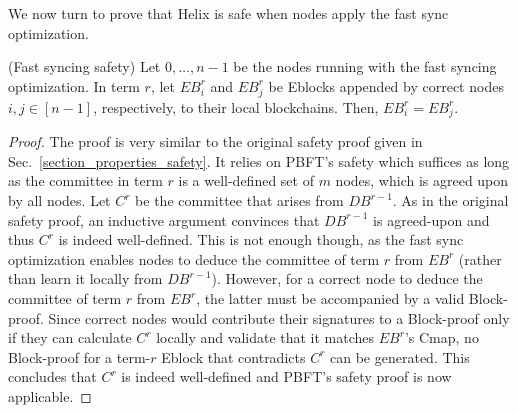 We now turn to prove that Helix is safe when nodes apply the fast sync optimization.
\begin{claim}{(Fast syncing safety)}
Let $0,\dots,n-1$ be the nodes running \name with the fast syncing optimization. In term $r$, let $EB^r_i$ and $EB^r_j$ be Eblocks appended by correct nodes $i,j\in [n-1]$, respectively, to their local blockchains. Then, $EB^r_i=EB^r_j$.
\end{claim}

\begin{proof}
The proof is very similar to the original safety proof given in Sec.~\ref{section_properties_safety}. It relies on PBFT's safety which suffices as long as the committee in term $r$ is a well-defined set of $m$ nodes, which is agreed upon by all nodes. 
Let $C^r$ be the committee that arises from $DB^{r-1}$. As in the original safety proof, an inductive argument convinces that $DB^{r-1}$ is agreed-upon and thus $C^r$ is indeed well-defined. This is not enough though, as the fast sync optimization enables nodes to deduce the committee of term $r$ from $EB^{r}$ (rather than learn it locally from $DB^{r-1}$). However, for a correct node to deduce the committee of term $r$ from $EB^{r}$, the latter must be accompanied by a valid Block-proof. Since correct nodes would contribute their signatures to a Block-proof only if they can calculate $C^r$ locally and validate that it matches $EB^r$'s Cmap, no Block-proof for a term-$r$ Eblock that contradicts $C^r$ can be generated. This concludes that $C^r$ is indeed well-defined and PBFT's safety proof is now applicable.
\end{proof}

